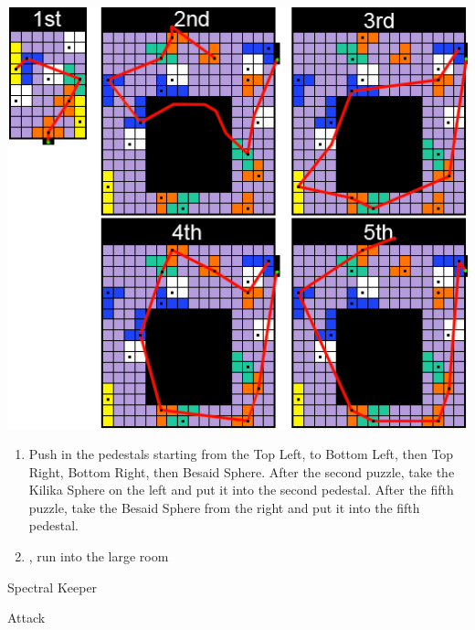 \includegraphics{graphics/Zanarkand_Trials}
\begin{enumerate}[resume]
	\item Push in the pedestals starting from the Top Left, to Bottom Left, then Top Right, Bottom Right, then Besaid Sphere. After the second puzzle, take the Kilika Sphere on the left and put it into the second pedestal. After the fifth puzzle, take the Besaid Sphere from the right and put it into the fifth pedestal.
	\item \cs, run into the large room
\end{enumerate}
\begin{battle}[52000]{Spectral Keeper}
	\begin{itemize}
		\summon{\bahamut}
		\bahamutf Attack
	\end{itemize}
\end{battle}
\vfill
